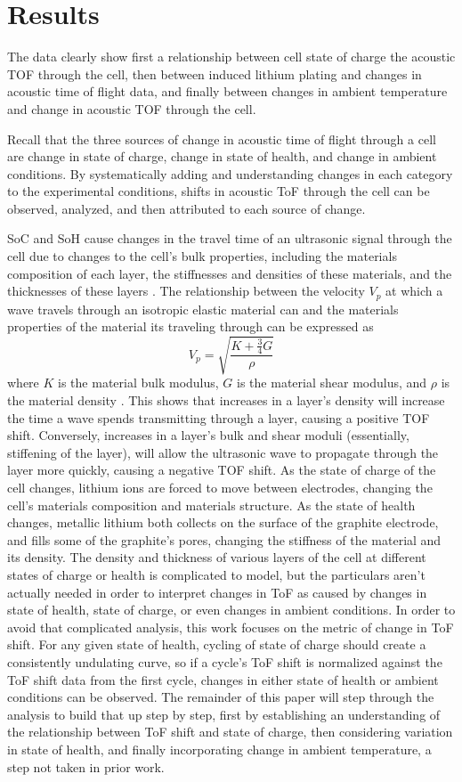 \chapter{Results}

The data clearly show first a relationship between cell state of charge the acoustic TOF through the cell, then between induced lithium plating and changes in acoustic time of flight data, and finally between changes in ambient temperature and change in acoustic TOF through the cell. 

Recall that the three sources of change in acoustic time of flight through a cell are change in state of charge, change in state of health, and change in ambient conditions. 
By systematically adding and understanding changes in each category to the experimental conditions, shifts in acoustic ToF through the cell can be observed, analyzed, and then attributed to each source of change.

SoC and SoH cause changes in the travel time of an ultrasonic signal through the cell due to changes to the cell's bulk properties, including the materials composition of each layer, the stiffnesses and densities of these materials, and the thicknesses of these layers \cite{SOC-SOH-EST}. The relationship between the velocity $V_p$ at which a wave travels through an isotropic elastic material can and the materials properties of the material its traveling through can be expressed as
$$ V_p = \sqrt{\frac{K + \frac{3}{4}G}{\rho}}$$
where $K$ is the material bulk modulus, $G$ is the material shear modulus, and $\rho$ is the material density \cite{SOC-SOH-EST}. This shows that increases in a layer's density will increase the time a wave spends transmitting through a layer, causing a positive TOF shift. Conversely, increases in a layer's bulk and shear moduli (essentially, stiffening of the layer), will allow the ultrasonic wave to propagate through the layer more quickly, causing a negative TOF shift. As the state of charge of the cell changes, lithium ions are forced to move between electrodes, changing the cell's materials composition and materials structure. As the state of health changes, metallic lithium both collects on the surface of the graphite electrode, and fills some of the graphite's pores, changing the stiffness of the material and its density. The density and thickness of various layers of the cell at different states of charge or health is complicated to model, but the particulars aren't actually needed in order to interpret changes in ToF as caused by changes in state of health, state of charge, or even changes in ambient conditions. In order to avoid that complicated analysis, this work focuses on the metric of change in ToF shift. For any given state of health, cycling of state of charge should create a consistently undulating curve, so if a cycle's ToF shift is normalized against the ToF shift data from the first cycle, changes in either state of health or ambient conditions can be observed. The remainder of this paper will step through the analysis to build that up step by step, first by establishing an understanding of the relationship between ToF shift and state of charge, then considering variation in state of health, and finally incorporating change in ambient temperature, a step not taken in prior work.

